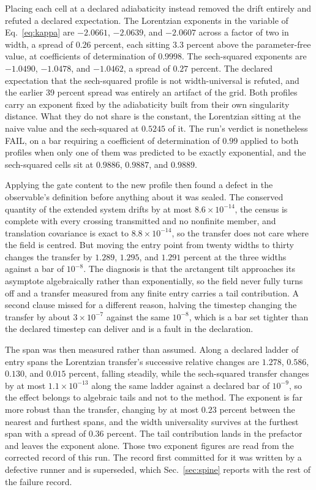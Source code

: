 \documentclass[aps,pre,reprint,nofootinbib,floatfix]{revtex4-2}
\begin{document}
Placing each cell at a declared adiabaticity instead removed the drift
entirely and refuted a declared expectation.  The Lorentzian exponents
in the variable of Eq.~\eqref{eq:kappa} are $-2.0661$, $-2.0639$, and
$-2.0607$ across a factor of two in width, a spread of $0.26$ percent,
each sitting $3.3$ percent above the parameter-free value, at
coefficients of determination of $0.9998$.  The sech-squared exponents
are $-1.0490$, $-1.0478$, and $-1.0462$, a spread of $0.27$ percent.
The declared expectation that the sech-squared profile is not
width-universal is refuted, and the earlier 39 percent spread was
entirely an artifact of the grid.  Both profiles carry an exponent
fixed by the adiabaticity built from their own singularity distance.
What they do not share is the constant, the Lorentzian sitting at the
naive value and the sech-squared at $0.5245$ of it.  The run's verdict
is nonetheless FAIL, on a bar requiring a coefficient of determination
of $0.99$ applied to both profiles when only one of them was predicted
to be exactly exponential, and the sech-squared cells sit at $0.9886$,
$0.9887$, and $0.9889$.

Applying the gate content to the new profile then found a defect in the
observable's definition before anything about it was sealed.  The
conserved quantity of the extended
system drifts by at most $8.6 \times 10^{-14}$, the census is complete
with every crossing transmitted and no nonfinite member, and
translation covariance is exact to $8.8 \times 10^{-14}$, so the
transfer does not care where the field is centred.  But moving the
entry point from twenty widths to thirty changes the transfer by
$1.289$, $1.295$, and $1.291$ percent at the three widths against a bar
of $10^{-8}$.  The diagnosis is that the arctangent tilt approaches
its asymptote algebraically rather than exponentially, so the field
never fully turns off and a transfer measured from any finite entry
carries a tail contribution.  A second clause missed for a different
reason, halving the timestep changing the transfer by about
$3 \times 10^{-7}$ against the same $10^{-8}$, which is a bar set
tighter than the declared timestep can deliver and is a fault in the
declaration.

The span was then measured rather than assumed.  Along a declared
ladder of entry spans the Lorentzian transfer's successive relative
changes are $1.278$, $0.586$, $0.130$, and $0.015$ percent, falling
steadily, while the sech-squared transfer changes by at most
$1.1 \times 10^{-13}$ along the same ladder against a declared bar of
$10^{-9}$, so the effect belongs to algebraic tails and not to the
method.  The exponent is far more robust than the transfer, changing by
at most $0.23$ percent between the nearest and furthest spans, and the
width universality survives at the furthest span with a spread of
$0.36$ percent.  The tail contribution lands in the prefactor and
leaves the exponent alone.  Those two exponent figures are read from
the corrected record of this run.  The record first committed for it
was written by a defective runner and is superseded, which
Sec.~\ref{sec:spine} reports with the rest of the failure record.
\end{document}
